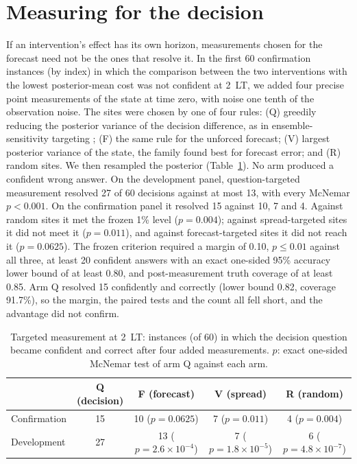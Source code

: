 \documentclass[11pt]{article}
\begin{document}
\section{Measuring for the decision}
\label{sec:measure}
If an intervention's effect has its own horizon, measurements chosen for the forecast need not be the ones that resolve it. In the first 60 confirmation instances (by index) in which the comparison between the two interventions with the lowest posterior-mean cost was not confident at 2~LT, we added four precise point measurements of the state at time zero, with noise one tenth of the observation noise. The sites were chosen by one of four rules: (Q) greedily reducing the posterior variance of the decision difference, as in ensemble-sensitivity targeting \citep{xie2013observing}; (F) the same rule for the unforced forecast; (V) largest posterior variance of the state, the family \citet{lorenz1998optimal} found best for forecast error; and (R) random sites. We then resampled the posterior (Table~\ref{tab:measure}). No arm produced a confident wrong answer. On the development panel, question-targeted measurement resolved 27 of 60 decisions against at most 13, with every McNemar $p < 0.001$. On the confirmation panel it resolved 15 against 10, 7 and 4. Against random sites it met the frozen 1\% level ($p = 0.004$); against spread-targeted sites it did not meet it ($p = 0.011$), and against forecast-targeted sites it did not reach it ($p = 0.0625$). The frozen criterion required a margin of 0.10, $p \le 0.01$ against all three, at least 20 confident answers with an exact one-sided 95\% accuracy lower bound of at least 0.80, and post-measurement truth coverage of at least 0.85. Arm Q resolved 15 confidently and correctly (lower bound 0.82, coverage 91.7\%), so the margin, the paired tests and the count all fell short, and the advantage did not confirm.

\begin{table}[t]
\centering
\small
\caption{Targeted measurement at 2~LT: instances (of 60) in which the decision question became confident and correct after four added measurements. $p$: exact one-sided McNemar test of arm Q against each arm.}
\label{tab:measure}
\begin{tabular}{lcccc}
\toprule
 & Q (decision) & F (forecast) & V (spread) & R (random) \\
\midrule
Confirmation & 15 & 10 ($p = 0.0625$) & 7 ($p = 0.011$) & 4 ($p = 0.004$) \\
Development  & 27 & 13 ($p = 2.6\times10^{-4}$) & 7 ($p = 1.8\times10^{-5}$) & 6 ($p = 4.8\times10^{-7}$) \\
\bottomrule
\end{tabular}
\end{table}
\end{document}
